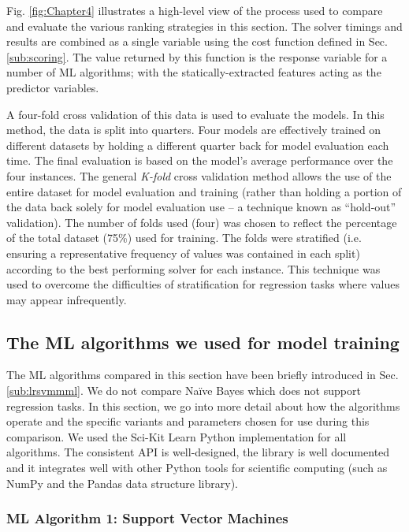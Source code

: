 Fig. \ref{fig:Chapter4} illustrates a high-level view of the process used to compare and evaluate the various ranking strategies in this section. 
The solver timings and results are combined as a single variable using the cost function defined in Sec. \ref{sub:scoring}.
The value returned by this function is the response variable for a number of ML algorithms; with the statically-extracted features acting as the predictor variables.

A four-fold cross validation of this data is used to evaluate the models. 
In this method, the data is split into quarters.
Four models are effectively trained on different datasets by holding a different quarter back for model evaluation each time.
The final evaluation is based on the model's average performance over the four instances.
The general \textit{K-fold} cross validation method allows the use of the entire dataset for model evaluation and training (rather than holding a portion of the data back solely for model evaluation use -- a technique known as ``hold-out'' validation). 
The number of folds used (four) was chosen to reflect the percentage of the total dataset (75\%) used for training. 
The folds were stratified (i.e. ensuring a representative frequency of values was contained in each split) according to the best performing solver for each instance.
This technique was used to overcome the difficulties of stratification for regression tasks where values may appear infrequently.  

\subsection{The ML algorithms we used for model training}

\label{sub:MLalgorithms}
The ML algorithms compared in this section have been briefly introduced in Sec. \ref{sub:lrsvmmml}. 
We do not compare Na\"ive Bayes which does not support regression tasks. 
In this section, we go into more detail about how the algorithms operate and the specific variants and parameters chosen for use during this comparison.
We used the Sci-Kit Learn \cite{sklearn} Python implementation for all algorithms.
The consistent API is well-designed, the library is well documented and it integrates well with other Python tools for scientific computing (such as NumPy and the Pandas data structure library).


\subsubsection{ML Algorithm 1: Support Vector Machines}

